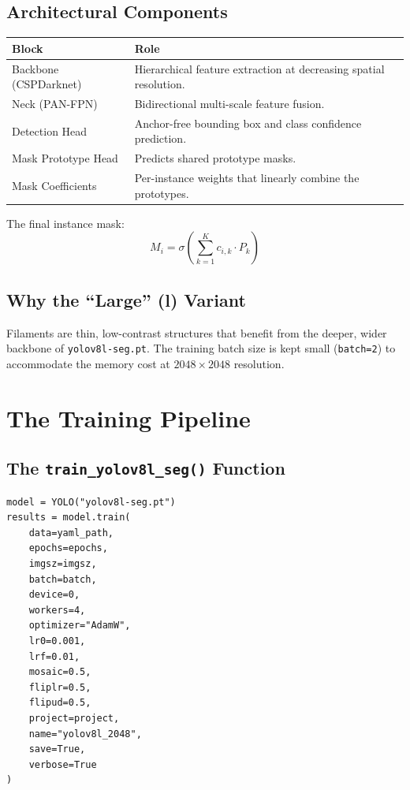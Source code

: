 \documentclass[11pt,a4paper,openany]{report}
\begin{document}
\section{Architectural Components}

\begin{center}
\renewcommand{\arraystretch}{1.3}
\begin{tabular}{l p{9cm}}
\toprule
\textbf{Block} & \textbf{Role} \\
\midrule
Backbone (CSPDarknet) & Hierarchical feature extraction at decreasing spatial resolution. \\
Neck (PAN-FPN) & Bidirectional multi-scale feature fusion. \\
Detection Head & Anchor-free bounding box and class confidence prediction. \\
Mask Prototype Head & Predicts shared prototype masks. \\
Mask Coefficients & Per-instance weights that linearly combine the prototypes. \\
\bottomrule
\end{tabular}
\end{center}

The final instance mask:
\[
  M_i = \sigma\!\left(\sum_{k=1}^{K} c_{i,k} \cdot P_k\right)
\]

\section{Why the ``Large'' (l) Variant}

Filaments are thin, low-contrast structures that benefit from the deeper, wider backbone of
\texttt{yolov8l-seg.pt}. The training batch size is kept small (\texttt{batch=2}) to accommodate the
memory cost at $2048\times2048$ resolution.

\chapter{The Training Pipeline}

\section{The \texttt{train\_yolov8l\_seg()} Function}

\begin{lstlisting}[caption={Model training invocation},label={lst:train}]
model = YOLO("yolov8l-seg.pt")
results = model.train(
    data=yaml_path,
    epochs=epochs,
    imgsz=imgsz,
    batch=batch,
    device=0,
    workers=4,
    optimizer="AdamW",
    lr0=0.001,
    lrf=0.01,
    mosaic=0.5,
    fliplr=0.5,
    flipud=0.5,
    project=project,
    name="yolov8l_2048",
    save=True,
    verbose=True
)
\end{lstlisting}
\end{document}
